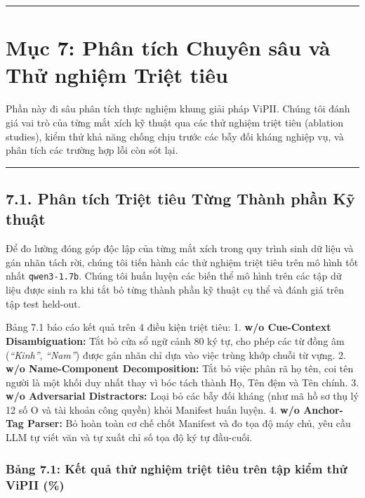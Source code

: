 \documentclass[
  11pt,
  a4paper,
]{article}
\begin{document}
\begin{center}\rule{0.5\linewidth}{0.5pt}\end{center}

\section{Mục 7: Phân tích Chuyên sâu và Thử nghiệm Triệt
tiêu}\label{mux1ee5c-7-phuxe2n-tuxedch-chuyuxean-suxe2u-vuxe0-thux1eed-nghiux1ec7m-triux1ec7t-tiuxeau}

Phần này đi sâu phân tích thực nghiệm khung giải pháp ViPII. Chúng tôi đánh giá vai trò của từng mắt
xích kỹ thuật qua các thử nghiệm triệt tiêu (ablation studies), kiểm thử khả năng chống chịu trước
các bẫy đối kháng nghiệp vụ, và phân tích các trường hợp lỗi còn sót lại.

\begin{center}\rule{0.5\linewidth}{0.5pt}\end{center}

\subsection{7.1. Phân tích Triệt tiêu Từng Thành phần Kỹ
thuật}\label{phuxe2n-tuxedch-triux1ec7t-tiuxeau-tux1eebng-thuxe0nh-phux1ea7n-kux1ef9-thuux1eadt}

Để đo lường đóng góp độc lập của từng mắt xích trong quy trình sinh dữ liệu và gán nhãn tách rời,
chúng tôi tiến hành các thử nghiệm triệt tiêu trên mô hình tốt nhất \texttt{qwen3-1.7b}. Chúng tôi
huấn luyện các biến thể mô hình trên các tập dữ liệu được sinh ra khi tắt bỏ từng thành phần kỹ
thuật cụ thể và đánh giá trên tập test held-out.

Bảng 7.1 báo cáo kết quả trên 4 điều kiện triệt tiêu: 1. \textbf{w/o Cue-Context Disambiguation:}
Tắt bỏ cửa sổ ngữ cảnh 80 ký tự, cho phép các từ đồng âm (\emph{``Kinh''}, \emph{``Nam''}) được gán
nhãn chỉ dựa vào việc trùng khớp chuỗi từ vựng. 2. \textbf{w/o Name-Component Decomposition:} Tắt bỏ
việc phân rã họ tên, coi tên người là một khối duy nhất thay vì bóc tách thành Họ, Tên đệm và Tên
chính. 3. \textbf{w/o Adversarial Distractors:} Loại bỏ các bẫy đối kháng (như mã hồ sơ thụ lý 12 số
\(\text{O}\) và tài khoản công quyền) khỏi Manifest huấn luyện. 4. \textbf{w/o Anchor-Tag Parser:}
Bỏ hoàn toàn cơ chế chốt Manifest và đo tọa độ máy chủ, yêu cầu LLM tự viết văn và tự xuất chỉ số
tọa độ ký tự đầu-cuối.

\subsubsection{Bảng 7.1: Kết quả thử nghiệm triệt tiêu trên tập kiểm thử ViPII
(\%)}\label{bux1ea3ng-7.1-kux1ebft-quux1ea3-thux1eed-nghiux1ec7m-triux1ec7t-tiuxeau-truxean-tux1eadp-kiux1ec3m-thux1eed-vipii}
\end{document}
